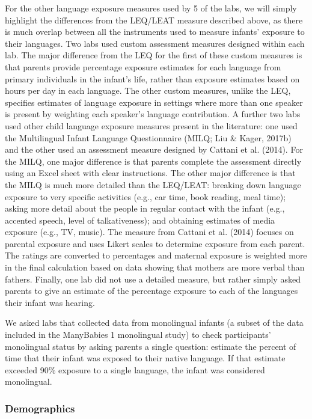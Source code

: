 \documentclass[english,,man,floatsintext]{apa6}
\begin{document}
For the other language exposure measures used by 5 of the labs, we will simply highlight the differences from the LEQ/LEAT measure described above, as there is much overlap between all the instruments used to measure infants' exposure to their languages. Two labs used custom assessment measures designed within each lab. The major difference from the LEQ for the first of these custom measures is that parents provide percentage exposure estimates for each language from primary individuals in the infant's life, rather than exposure estimates based on hours per day in each language. The other custom measures, unlike the LEQ, specifies estimates of language exposure in settings where more than one speaker is present by weighting each speaker's language contribution. A further two labs used other child language exposure measures present in the literature: one used the Multilingual Infant Language Questionnaire (MILQ; Liu \& Kager, 2017b) and the other used an assessment measure designed by Cattani et al. (2014). For the MILQ, one major difference is that parents complete the assessment directly using an Excel sheet with clear instructions. The other major difference is that the MILQ is much more detailed than the LEQ/LEAT: breaking down language exposure to very specific activities (e.g., car time, book reading, meal time); asking more detail about the people in regular contact with the infant (e.g., accented speech, level of talkativeness); and obtaining estimates of media exposure (e.g., TV, music). The measure from Cattani et al. (2014) focuses on parental exposure and uses Likert scales to determine exposure from each parent. The ratings are converted to percentages and maternal exposure is weighted more in the final calculation based on data showing that mothers are more verbal than fathers. Finally, one lab did not use a detailed measure, but rather simply asked parents to give an estimate of the percentage exposure to each of the languages their infant was hearing.

We asked labs that collected data from monolingual infants (a subset of the data included in the ManyBabies 1 monolingual study) to check participants' monolingual status by asking parents a single question: estimate the percent of time that their infant was exposed to their native language. If that estimate exceeded 90\% exposure to a single language, the infant was considered monolingual.

\hypertarget{demographics}{%
\subsubsection{Demographics}\label{demographics}}
\end{document}

